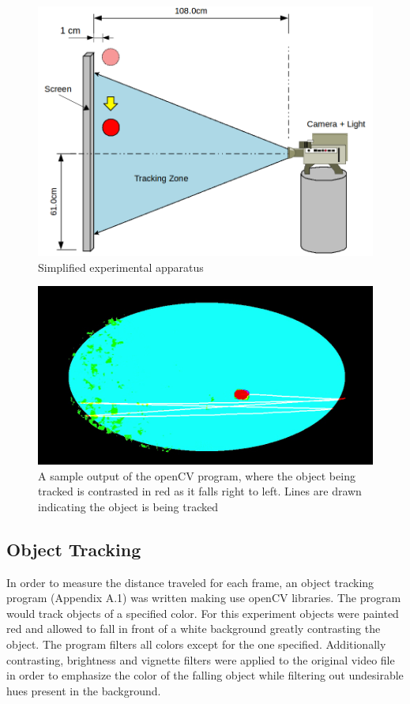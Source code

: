 \documentclass[paper=a4, fontsize=11pt, abstract=on]{scrartcl}
\numberwithin{equation}{section}		%
\numberwithin{figure}{section}			%
\numberwithin{table}{section}				%
\begin{document}
\begin{figure}[H]
\centering
\includegraphics[width=0.75\linewidth]{schem}
\caption{Simplified experimental apparatus}
\label{schem}
\end{figure}

\begin{figure}[H]
\centering
\includegraphics[width=0.5\linewidth]{contrast.jpg}
\caption{A sample output of the openCV program, where the object being tracked is contrasted in red as it falls right to left. Lines are drawn indicating the object is being tracked}
\label{cont}
\end{figure}




\subsection{Object Tracking}
In order to measure the distance traveled for each frame, an object tracking program (Appendix A.1) was written making use openCV libraries. The program would track objects of a specified color. For this experiment objects were painted red and allowed to fall in front of a white background greatly contrasting the object. The program filters all colors except for the one specified. Additionally contrasting, brightness and vignette filters were applied to the original video file in order to emphasize the color of the falling object while filtering out undesirable hues present in the background. 
\end{document}
